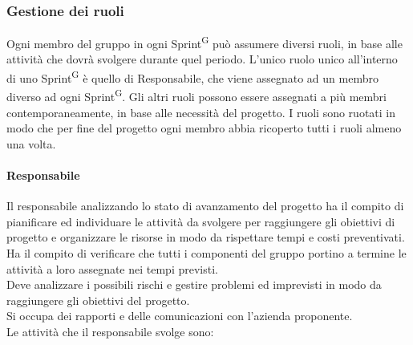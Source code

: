 \documentclass[a4paper, 11pt]{article}
\begin{document}
\subsubsection{Gestione dei ruoli} 
Ogni membro del gruppo in ogni Sprint\textsuperscript{G} può assumere diversi ruoli, in base alle attività che dovrà svolgere durante quel periodo. 
L'unico ruolo unico all'interno di uno Sprint\textsuperscript{G} è quello di Responsabile, che viene assegnato ad un membro diverso ad ogni Sprint\textsuperscript{G}.
Gli altri ruoli possono essere assegnati a più membri contemporaneamente, in base alle necessità del progetto.
I ruoli sono ruotati in modo che per fine del progetto ogni membro abbia ricoperto tutti i ruoli almeno una volta.
\paragraph{Responsabile}
Il responsabile analizzando lo stato di avanzamento del progetto ha il compito di pianificare ed individuare le attività da svolgere 
    per raggiungere gli obiettivi di progetto e organizzare le risorse in modo da rispettare tempi e costi preventivati. \\
    Ha il compito di verificare che tutti i componenti del gruppo portino a termine le attività a loro assegnate nei tempi previsti. \\
    Deve analizzare i possibili rischi e gestire problemi ed imprevisti in modo da raggiungere gli obiettivi del progetto.\\
    Si occupa dei rapporti e delle comunicazioni con l'azienda proponente.\\
    Le attività che il responsabile svolge sono:\\
\end{document}
